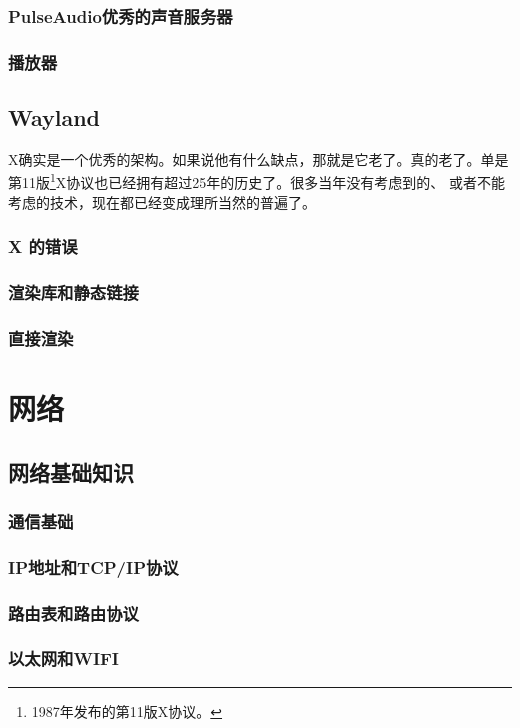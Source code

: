 \documentclass[amstex,twoside]{ctexbook}
\begin{document}
\subsection{PulseAudio优秀的声音服务器}
\subsection{播放器}

\section{Wayland}

X确实是一个优秀的架构。如果说他有什么缺点，那就是它老了。真的老了。单是第11版\footnote{1987年发布的第11版X协议。}X协议也已经拥有超过25年的历史了。很多当年没有考虑到的、
或者不能考虑的技术，现在都已经变成理所当然的普遍了。



\subsection{X 的错误}

\subsection{渲染库和静态链接}

\subsection{直接渲染}

\chapter{网络}\label{chap:network}
\section{网络基础知识}
\subsection{通信基础}
\subsection{IP地址和TCP/IP协议}
\subsection{路由表和路由协议}
\subsection{以太网和WIFI}
\end{document}
